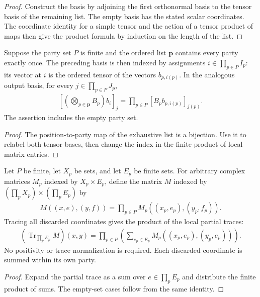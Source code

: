 \begin{proof}
    \leanok
    Construct the basis by adjoining the first orthonormal basis to the tensor
    basis of the remaining list. The empty basis has the stated scalar
    coordinates. The coordinate identity for a simple tensor and the action of
    a tensor product of maps then give the product formula by induction on the
    length of the list.
\end{proof}

\begin{definition}
    \label{def:party-labelled-tensor-coordinates}
    \leanok
    Suppose the party set $P$ is finite and the ordered list $\mathbf p$
    contains every party exactly once. The preceding basis is then indexed by
    assignments $i\in\prod_{p\in P}I_p$: its vector at $i$ is the ordered tensor
    of the vectors $b_{p,i(p)}$. In the analogous output basis, for every
    $j\in\prod_{p\in P}J_p$,
    \begin{align}
        \left[\left(\bigotimes_{p\in\mathbf p}B_p\right)b_i\right]_j
        =\prod_{p\in P}[B_pb_{p,i(p)}]_{j(p)}.
    \end{align}
    The assertion includes the empty party set.
\end{definition}

\begin{proof}
    \leanok
    The position-to-party map of the exhaustive list is a bijection. Use it to
    relabel both tensor bases, then change the index in the finite product of
    local matrix entries.
\end{proof}

\begin{theorem}
    \label{thm:party-product-partial-trace}
    \leanok
    Let $P$ be finite, let $X_p$ be sets, and let $E_p$ be finite sets. For
    arbitrary complex matrices $M_p$ indexed by $X_p\times E_p$, define the
    matrix $M$ indexed by
    $(\prod_p X_p)\times(\prod_p E_p)$ by
    \begin{align}
        M((x,e),(y,f))=\prod_{p\in P}M_p((x_p,e_p),(y_p,f_p)).
    \end{align}
    Tracing all discarded coordinates gives the product of the local partial
    traces:
    \begin{align}
        (\operatorname{Tr}_{\prod_p E_p}M)(x,y)
        =\prod_{p\in P}\left(\sum_{e_p\in E_p}
        M_p((x_p,e_p),(y_p,e_p))\right).
    \end{align}
    No positivity or trace normalization is required. Each discarded coordinate
    is summed within its own party.
\end{theorem}

\begin{proof}
    \leanok
    Expand the partial trace as a sum over $e\in\prod_pE_p$ and distribute the
    finite product of sums. The empty-set cases follow from the same identity.
\end{proof}
